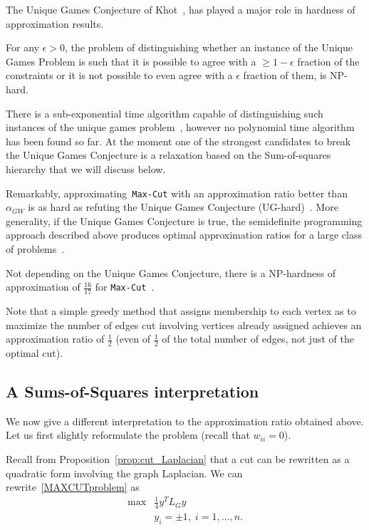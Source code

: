The Unique Games Conjecture of Khot~\cite{SKhot_2002}, has played a major role in hardness of approximation results.

\begin{conjecture}
For any $\epsilon>0$, the problem of distinguishing whether an instance of the Unique Games Problem is such that it is possible to agree with a $\geq 1-\epsilon$ fraction of the constraints or it is not possible to even agree with a $\epsilon$ fraction of them, is NP-hard.
\end{conjecture}

There is a sub-exponential time algorithm capable of distinguishing such instances of the unique games problem~\cite{Arora_Barak_Steurer_2010}, however no polynomial time algorithm has been found so far. At the moment one of the strongest candidates to break the Unique Games Conjecture is a relaxation based on the Sum-of-squares hierarchy that we will discuss below.


Remarkably, approximating~\texttt{Max-Cut} with an approximation ratio better than $\alpha_{GW}$ is as hard as refuting the Unique Games Conjecture (UG-hard)~\cite{Khot_Kindler_Mossel_ODonnel_2005}. More generality, if the Unique Games Conjecture is true, the semidefinite programming approach described above produces optimal approximation ratios for a large class of problems~\cite{Raghavendra_2008_optimalitySDP_UG}.

Not depending on the Unique Games Conjecture, there is a NP-hardness of approximation of $\frac{16}{17}$ for \texttt{Max-Cut}~\cite{Hastad_inapproximability}.

\begin{remark}
Note that a simple greedy method that assigns membership to each vertex as to maximize the number of edges cut involving vertices already assigned achieves an approximation ratio of $\frac12$ (even of $\frac12$ of the total number of edges, not just of the optimal cut).
\end{remark}



\subsection{A Sums-of-Squares interpretation}

We now give a different interpretation to the approximation ratio obtained above. Let us first slightly reformulate the problem (recall that $w_{ii}=0$).


Recall from Proposition~\ref{prop:cut_Laplacian} that a cut can be rewritten as a quadratic form involving the graph Laplacian. We can rewrite~\eqref{MAXCUTproblem} as
\begin{equation}\label{MAXCUTproblem_LG}
\begin{array}{cl}
\max &\frac14 y^T L_G y \\
 & y_{i}=\pm1,\; i=1,\ldots,n.
\end{array}
\end{equation}

